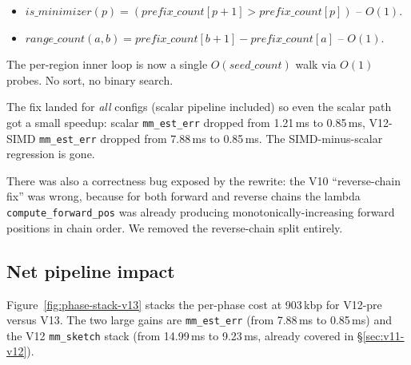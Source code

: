 \begin{itemize}
\item $\textit{is\_minimizer}(p) = (\textit{prefix\_count}[p+1] > \textit{prefix\_count}[p])$ -- $O(1)$.
\item $\textit{range\_count}(a, b) = \textit{prefix\_count}[b+1] - \textit{prefix\_count}[a]$ -- $O(1)$.
\end{itemize}

The per-region inner loop is now a single $O(\textit{seed\_count})$
walk via $O(1)$ probes.  No sort, no binary search.

The fix landed for \emph{all} configs (scalar pipeline included) so
even the scalar path got a small speedup: scalar
\texttt{mm\_est\_err} dropped from 1.21\,ms to 0.85\,ms, V12-SIMD
\texttt{mm\_est\_err} dropped from 7.88\,ms to 0.85\,ms.  The
SIMD-minus-scalar regression is gone.

There was also a correctness bug exposed by the rewrite: the V10
``reverse-chain fix'' was wrong, because for both forward and
reverse chains the lambda \texttt{compute\_forward\_pos} was
already producing monotonically-increasing forward positions in
chain order. We removed the reverse-chain split entirely.

\subsection{Net pipeline impact}

Figure~\ref{fig:phase-stack-v13} stacks the per-phase cost at
903\,kbp for V12-pre versus V13.  The two large gains are
\texttt{mm\_est\_err} (from 7.88\,ms to 0.85\,ms) and the V12
\texttt{mm\_sketch} stack (from 14.99\,ms to 9.23\,ms, already
covered in \S\ref{sec:v11-v12}).

